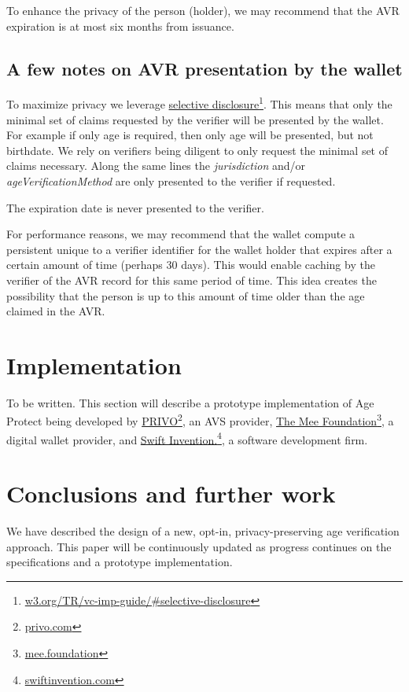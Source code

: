 \documentclass[11pt, oneside]{article}   	%
\newcommand{\hyperfootnote}[1][]{\def\ArgI{{#1}}\hyperfootnoteRelay}
\newcommand\hyperfootnoteRelay[2][]{\href{#1#2}{\ArgI}\footnote{\href{#1#2}{#2}}}
\begin{document}
To enhance the privacy of the person (holder), we may recommend that the AVR expiration is at most six months from issuance. 

\subsection{A few notes on AVR presentation by the wallet}

To maximize privacy we leverage \hyperfootnote[selective disclosure][https://]{w3.org/TR/vc-imp-guide/\#selective-disclosure}. This means that only the minimal set of claims requested by the verifier will be presented by the wallet. For example if only age is required, then only age will be presented, but not birthdate. We rely on verifiers being diligent to only request the minimal set of claims necessary. Along the same lines the \emph{jurisdiction} and/or \emph{ageVerificationMethod} are only presented to the verifier if requested. 

The expiration date is never presented to the verifier.

For performance reasons, we may recommend that the wallet compute a persistent unique to a verifier identifier for the wallet holder that expires after a certain amount of time (perhaps 30 days). This would enable caching by the verifier of the AVR record for this same period of time. This idea creates the possibility that the person is up to this amount of time older than the age claimed in the AVR. 

\section{Implementation}

To be written. This section will describe a prototype implementation of Age Protect being developed by \hyperfootnote[PRIVO][https://]{privo.com}, an AVS provider, \hyperfootnote[The Mee Foundation][https://]{mee.foundation}, a digital wallet provider, and \hyperfootnote[Swift Invention.][https://]{swiftinvention.com}, a software development firm.

\section{Conclusions and further work}
We have described the design of a new, opt-in, privacy-preserving age verification approach. This paper will be continuously updated as progress continues on the specifications and a prototype implementation.



\end{document}
